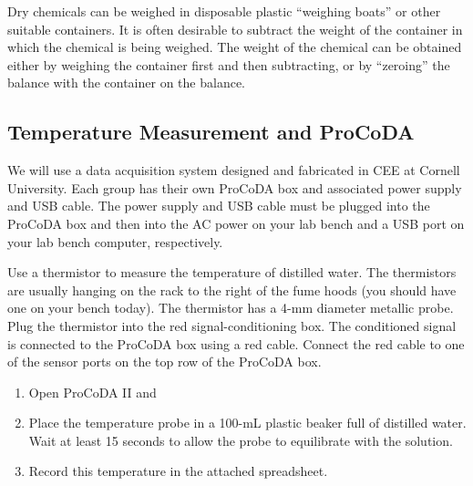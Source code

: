 \documentclass[letterpaper,10pt,english]{sphinxmanual}
\begin{document}
Dry chemicals can be weighed in disposable plastic “weighing boats” or other suitable containers. It is often desirable to subtract the weight of the container in which the chemical is being weighed. The weight of the chemical can be obtained either by weighing the container first and then subtracting, or by “zeroing” the balance with the container on the balance.


\subsection{Temperature Measurement and ProCoDA}
\label{\detokenize{Laboratory_Measurements/Laboratory_Measurements:temperature-measurement-and-procoda}}
We will use a data acquisition system designed and fabricated in CEE at Cornell University. Each group has their own ProCoDA box and associated power supply and USB cable. The power supply and USB cable must be plugged into the ProCoDA box and then into the AC power on your lab bench and a USB port on your lab bench computer, respectively.

Use a thermistor to measure the temperature of distilled water. The thermistors are usually hanging on the rack to the right of the fume hoods (you should have one on your bench today). The thermistor has a 4-mm diameter metallic probe. Plug the thermistor into the red signal-conditioning box. The conditioned signal is connected to the ProCoDA box using a red cable. Connect the red cable to one of the sensor ports on the top row of the ProCoDA box.
\begin{enumerate}
\item {} 
Open ProCoDA II and {\hyperref[\detokenize{ProCoDA/ProCoDA:heading-procoda-temperature-measurement}]{}}

\item {} 
Place the temperature probe in a 100-mL plastic beaker full of distilled water. Wait at least 15 seconds to allow the probe to equilibrate with the solution.

\item {} 
Record this temperature in the attached spreadsheet.

\end{enumerate}
\end{document}
